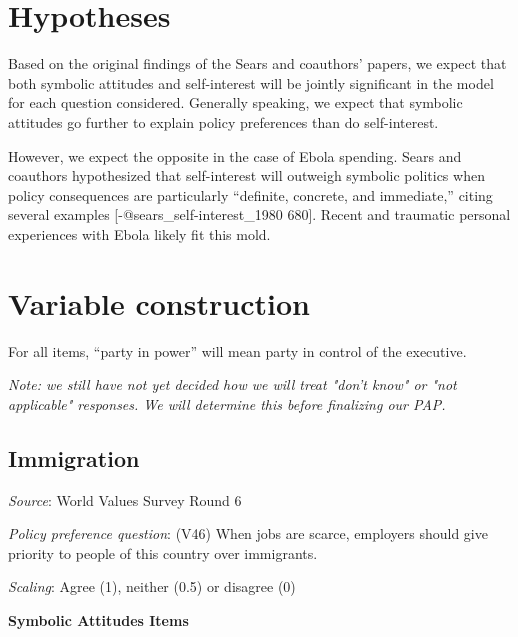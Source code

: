 \documentclass[]{article}
\begin{document}
\section{Hypotheses}\label{hypotheses}

Based on the original findings of the Sears and coauthors' papers, we
expect that both symbolic attitudes and self-interest will be jointly
significant in the model for each question considered. Generally
speaking, we expect that symbolic attitudes go further to explain policy
preferences than do self-interest.

However, we expect the opposite in the case of Ebola spending. Sears and
coauthors hypothesized that self-interest will outweigh symbolic
politics when policy consequences are particularly ``definite, concrete,
and immediate,'' citing several examples {[}-@sears\_self-interest\_1980
680{]}. Recent and traumatic personal experiences with Ebola likely fit
this mold.

\section{Variable construction}\label{variable-construction}

For all items, ``party in power'' will mean party in control of the
executive.

\textit{Note: we still have not yet decided how we will treat "don't know" or "not applicable" responses. We will determine this before finalizing our PAP.}

\subsection{Immigration}\label{immigration}

\textit{Source}: World Values Survey Round 6

\textit{Policy preference question}: (V46) When jobs are scarce,
employers should give priority to people of this country over
immigrants.

\textit{Scaling}: Agree (1), neither (0.5) or disagree (0)

\textbf{Symbolic Attitudes Items}
\end{document}
